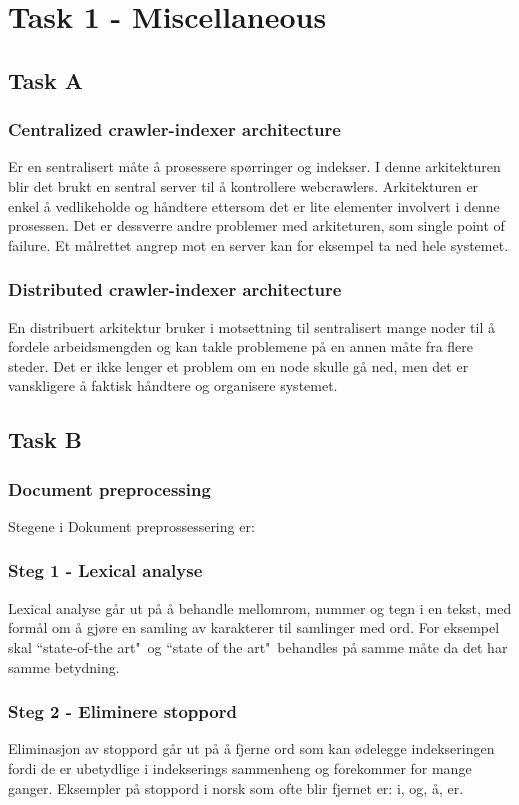 \section*{Task 1 - Miscellaneous}

\subsection*{Task A}
\subsubsection*{Centralized crawler-indexer architecture}
Er en sentralisert måte å prosessere spørringer og indekser. I denne arkitekturen blir det brukt en sentral server til å kontrollere webcrawlers. Arkitekturen er enkel å vedlikeholde og håndtere ettersom det er lite elementer involvert i denne prosessen. Det er dessverre andre problemer med arkiteturen, som single point of failure. Et målrettet angrep mot en server kan for eksempel ta ned hele systemet.

\subsubsection*{Distributed crawler-indexer architecture}
En distribuert arkitektur bruker i motsettning til sentralisert mange noder til å fordele arbeidsmengden og kan takle problemene på en annen måte fra flere steder. Det er ikke lenger et problem om en node skulle gå ned, men det er vanskligere å faktisk håndtere og organisere systemet.

\subsection*{Task B}
\subsubsection*{Document preprocessing}
Stegene i Dokument preprossessering er:

\subsubsection*{Steg 1 - Lexical analyse}
Lexical analyse går ut på å behandle mellomrom, nummer og tegn i en tekst, med formål om å gjøre en samling av karakterer til samlinger med ord. For eksempel skal ``state-of-the art"\ og ``state of the art"\ behandles på samme måte da det har samme betydning.

\subsubsection*{Steg 2 - Eliminere stoppord}
Eliminasjon av stoppord går ut på å fjerne ord som kan ødelegge indekseringen fordi de er ubetydlige i indekserings sammenheng og forekommer for mange ganger. Eksempler på stoppord i norsk som ofte blir fjernet er: i, og, å, er.

